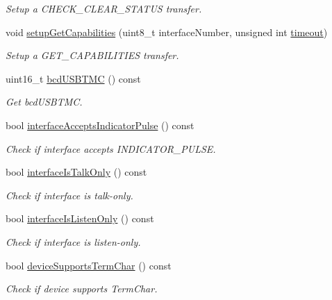 \begin{DoxyCompactItemize}
\begin{DoxyCompactList}\small\item\em Setup a C\-H\-E\-C\-K\-\_\-\-C\-L\-E\-A\-R\-\_\-\-S\-T\-A\-T\-U\-S transfer. \end{DoxyCompactList}\item 
void \hyperlink{classmdt_usbtmc_control_transfer_a1c2dd98480cfd0a7568997baef0dd9f5}{setup\-Get\-Capabilities} (uint8\-\_\-t interface\-Number, unsigned int \hyperlink{classmdt_usb_transfer_a3262511f6062348132e7ee689c24226c}{timeout})
\begin{DoxyCompactList}\small\item\em Setup a G\-E\-T\-\_\-\-C\-A\-P\-A\-B\-I\-L\-I\-T\-I\-E\-S transfer. \end{DoxyCompactList}\item 
uint16\-\_\-t \hyperlink{classmdt_usbtmc_control_transfer_a9d15b801836965c0cf6c2e1f4129ee39}{bcd\-U\-S\-B\-T\-M\-C} () const 
\begin{DoxyCompactList}\small\item\em Get bcd\-U\-S\-B\-T\-M\-C. \end{DoxyCompactList}\item 
bool \hyperlink{classmdt_usbtmc_control_transfer_a5b10459793ddbfeaa8ce73485f1bd4a1}{interface\-Accepts\-Indicator\-Pulse} () const 
\begin{DoxyCompactList}\small\item\em Check if interface accepts I\-N\-D\-I\-C\-A\-T\-O\-R\-\_\-\-P\-U\-L\-S\-E. \end{DoxyCompactList}\item 
bool \hyperlink{classmdt_usbtmc_control_transfer_a3d36514cb8af036905dde235d998fe65}{interface\-Is\-Talk\-Only} () const 
\begin{DoxyCompactList}\small\item\em Check if interface is talk-\/only. \end{DoxyCompactList}\item 
bool \hyperlink{classmdt_usbtmc_control_transfer_a05c81d3b4276d0d960286a9a3c02f0fb}{interface\-Is\-Listen\-Only} () const 
\begin{DoxyCompactList}\small\item\em Check if interface is listen-\/only. \end{DoxyCompactList}\item 
bool \hyperlink{classmdt_usbtmc_control_transfer_a2c3231d6314f7ed4e6d16505ff579e3b}{device\-Supports\-Term\-Char} () const 
\begin{DoxyCompactList}\small\item\em Check if device supports Term\-Char. \end{DoxyCompactList}\item 

\end{DoxyCompactItemize}
